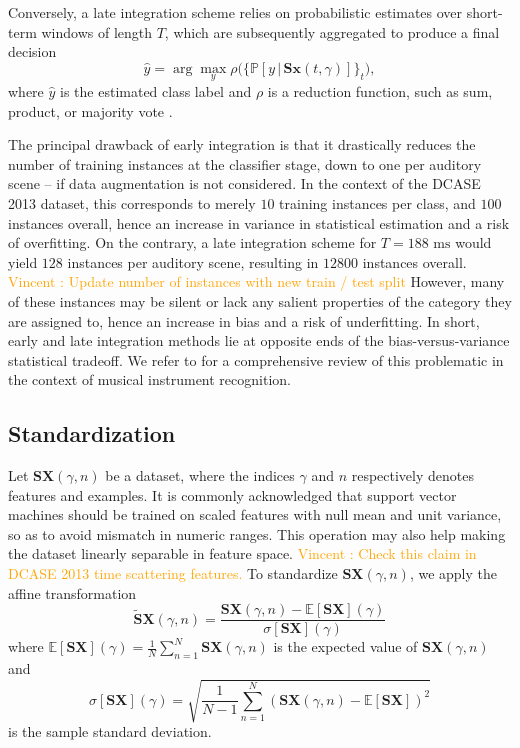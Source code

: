 \documentclass[journal]{IEEEtran}
\newcommand{\vl}[1]{\textcolor{orange}{Vincent : #1}}
\begin{document}
Conversely, a late integration scheme relies on probabilistic estimates over short-term windows of length $T$, which are subsequently aggregated to produce a final decision
\begin{equation}
\hat{y} = \arg \max_{y} \rho\Big(\big\{ \mathbb{P}\left[y \,\vert\, \mathbf{S}\boldsymbol{x}(t,\gamma) \right] \big\}_{t} \Big),
\end{equation}
where $\hat{y}$ is the estimated class label and $\rho$ is a reduction function, such as sum, product, or majority vote \cite{Kittler1998}.

The principal drawback of early integration is that it drastically reduces the number of training instances at the classifier stage, down to one per auditory scene -- if data augmentation is not considered.
In the context of the DCASE 2013 dataset, this corresponds to merely $10$ training instances per class, and $100$ instances overall, hence an increase in variance in statistical estimation and a risk of overfitting.
On the contrary, a late integration scheme for $T=188\textrm{ ms}$ would yield $128$ instances per auditory scene, resulting in $12800$ instances overall.
\vl{Update number of instances with new train / test split}
However, many of these instances may be silent or lack any salient properties of the category they are assigned to, hence an increase in bias and a risk of underfitting.
In short, early and late integration methods lie at opposite ends of the bias-versus-variance statistical tradeoff. We refer to \cite{Joder2009} for a comprehensive review of this problematic in the context of musical instrument recognition.

\subsection{Standardization}
Let $\mathbf{S}\boldsymbol{X}(\gamma,n)$ be a dataset, where the indices $\gamma$ and $n$ respectively denotes features and examples.
It is commonly acknowledged that support vector machines should be trained on scaled features with null mean and unit variance, so as to avoid mismatch in numeric ranges.
This operation may also help making the dataset linearly separable in feature space.
\vl{Check this claim in DCASE 2013 time scattering features.}
To standardize $\mathbf{S}\boldsymbol{X}(\gamma,n)$, we apply the affine transformation
\begin{equation}
\widetilde{\mathbf{S}}\boldsymbol{X}(\gamma, n) =
\dfrac{ \mathbf{S}\boldsymbol{X}(\gamma, n) -
\mathbb{E}[ \mathbf{S}\boldsymbol{X}](\gamma)}{\sigma[ \mathbf{S}\boldsymbol{X}](\gamma)}
\end{equation}
where $\mathbb{E}[ \mathbf{S}\boldsymbol{X}](\gamma) = \frac{1}{N} \sum_{n=1}^{N} \mathbf{S}\boldsymbol{X}(\gamma,n)$ is the expected value of $\mathbf{S}\boldsymbol{X}(\gamma,n)$ and
\begin{equation}
\sigma[\mathbf{S}\boldsymbol{X}] (\gamma) =
\sqrt{\frac{1}{N-1} \sum_{n=1}^{N}
\left( \mathbf{S}\boldsymbol{X}(\gamma,n) - \mathbb{E}[\mathbf{S}\boldsymbol{X}] \right)^2}
\end{equation}
 is the sample standard deviation.
 
\end{document}

